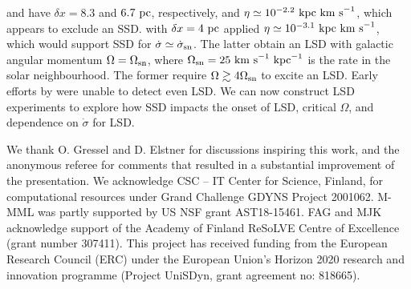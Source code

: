 \documentclass[preprint2]{aastex63}
\newcommand\SNr{\dot\sigma_{\rm sn}}
\newcommand\OSN{\Omega_{\rm sn}}
\newcommand\kpc{~ {\rm kpc}}
\newcommand\pc{~ {\rm pc}}
\newcommand\dx{ {\delta x}}
\newcommand\kms{~ {\rm km~ s}^{-1}}
\newcommand{\fg}[1]{\textcolor{midgreen}{#1}}
\newcommand{\mm}[1]{\textcolor{mypurple}{#1}}
\begin{document}
 \citet{Gressel:2008} and \citet{GE20} have $\dx=8.3$ and $6.7\pc$,
 respectively, and $\eta\simeq10^{-2.2}\kpc\kms$, which appears to exclude
 an SSD.
 \citet{Gent:2013a} with $\dx=4\pc$ applied $\eta\simeq10^{-3.1}\kpc\kms$,
 which would support SSD for $\dot\sigma\simeq\SNr$.
 The latter obtain an LSD with galactic angular momentum $\Omega=\OSN$, where
 $\OSN=25\kms\kpc^{-1}$ is the rate in the solar neighbourhood.
 The former require $\Omega\gtrsim4\OSN$ to excite an LSD.
 Early efforts by \citet{Korpi:1999b} were unable to detect even LSD.
 \fg{We can now construct LSD experiments to explore how SSD impacts the 
 onset of LSD, critical $\Omega$, and dependence on $\dot\sigma$ for LSD.}   

\acknowledgments
\mm{We thank O. Gressel \fg{and D. Elstner} for discussions inspiring this work, and the
  anonymous referee for comments that resulted in a substantial
  improvement of the presentation.}
We acknowledge CSC – IT Center for Science, Finland, for
computational resources under Grand Challenge GDYNS Project 2001062.
M-MML was partly supported by US NSF grant AST18-15461.
FAG and MJK acknowledge support of the Academy of Finland
ReSoLVE Centre of Excellence (grant number 307411).
This project has received funding from the European Research Council (ERC)
under the European Union's Horizon 2020 research and innovation
programme (Project UniSDyn, grant agreement no: 818665).
\end{document}
